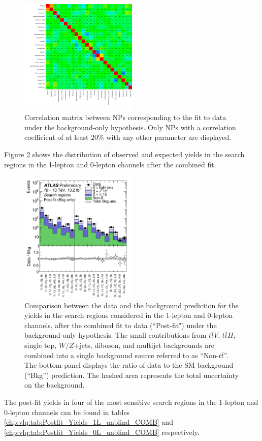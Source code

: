 \begin{figure}[htb!]
\centering
\includegraphics[width=0.5\textwidth]{figures/VLQ/CorrMatrix.png}
\captionsetup{width=0.85\textwidth} \caption{\small Correlation matrix between NPs corresponding to the fit to data under the background-only hypothesis. Only NPs with a correlation coefficient of at least $20\%$ with any other parameter are displayed.}
\label{sec:vlq:fig:corrmatrix}
\end{figure}


Figure \ref{sec:vlq:fig:postfityields} shows the distribution of observed and expected yields in the search regions in the 1-lepton and 0-lepton channels after the combined fit.
\begin{figure}[htb!]
\centering
\includegraphics[width=0.5\textwidth]{figures/VLQ/fig_09.png}
\captionsetup{width=0.85\textwidth} \caption{\small Comparison between the data and the background prediction for the yields in the search regions considered in the 1-lepton and 0-lepton channels, after the combined fit to data (``Post-fit") under the background-only hypothesis. The small contributions from $t\bar{t}V$, $t\bar{t} H$, single top, $W/Z$+jets, diboson, and multijet backgrounds are combined into a single background source referred to as ``Non-$t\bar{t}$''. The bottom panel displays the ratio of data to the SM background (``Bkg'') prediction. The hashed area represents the total uncertainty on the background. }
\label{sec:vlq:fig:postfityields}
\end{figure}
The post-fit yields in four of the most sensitive search regions in the 1-lepton and 0-lepton channels can be found in tables \ref{chp:vlq:tab:Postfit_Yields_1L_unblind_COMB} and \ref{chp:vlq:tab:Postfit_Yields_0L_unblind_COMB} respectively.

